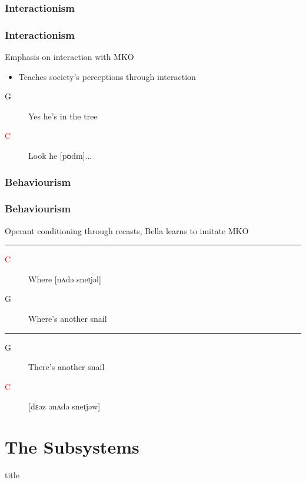 \documentclass[compress]{beamer}
\begin{document}
\subsubsection{Interactionism}
\begin{frame}
	\frametitle{Interactionism}
	
	Emphasis on interaction with MKO
	
	\begin{itemize}
		\item Teaches society's perceptions through interaction
	\end{itemize}
	\begin{description}
		\item[G] Yes he's in the tree
		\item[\textcolor{red}{C}] Look he [pʊdɪn]...
	\end{description}
\end{frame}

\subsubsection{Behaviourism}
\begin{frame}
	\frametitle{Behaviourism}
	
	\begin{block}{}
		Operant conditioning through recasts, Bella learns to imitate MKO
	\end{block}
	
	\noindent\rule{\textwidth}{1pt}
	
	\begin{description}
		\item[\textcolor{red}{C}] Where [nʌdə sneɪjəl]
		\item[G] Where's another snail
	\end{description}
	
	\noindent\rule{\textwidth}{1pt}
	
	\begin{description}
		\item[G] There's another snail
		\item[\textcolor{red}{C}] [dɛəz ənʌdə sneɪjəw]
	\end{description}
	
\end{frame}

\section{The Subsystems}
\begin{frame}
	\vfill
	\centering
	\begin{beamercolorbox}[sep=8pt,center,shadow=true,rounded=true]{title}
	\insertsectionhead\par%
 	\end{beamercolorbox}
 	\vfill
 \end{frame}
\end{document}
